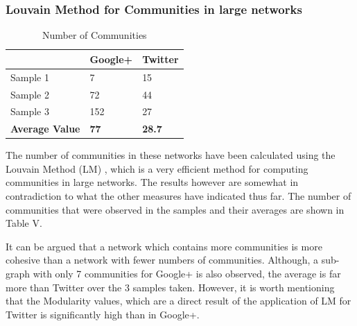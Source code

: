 \documentclass[a4paper, 10pt, conference]{ieeeconf}      %
\begin{document}
\subsubsection{Louvain Method for Communities in large networks \cite{c8}}

\begin{table}[htb]
\caption{Number of Communities}
\begin{center}
\begin{tabular}{ | l | l | l |} 
\hline
& \textbf{Google+} & \textbf{Twitter}\\[0.5ex]
\hline
Sample 1 & 7 & 15\\
Sample 2 & 72 & 44\\
Sample 3 & 152 & 27\\[0.5ex]
\hline
\textbf{Average Value} & \textbf{77} & \textbf{28.7}\\[0.5ex]
\hline
\end{tabular}
\end{center}
\end{table}

The number of communities in these networks have been calculated using the Louvain Method (LM) \cite{c8}, which is a very efficient method for computing communities in large networks. The results however are somewhat in contradiction to what the other measures have indicated thus far. The number of communities that were observed in the samples and their averages are shown in Table V.



It can be argued that a network which contains more communities is more cohesive than a network with fewer numbers of communities. Although, a sub-graph with only 7 communities for Google+ is also observed, the average is far more than Twitter over the 3 samples taken.
However, it is worth mentioning that the Modularity values, which are a direct result of the application of LM for Twitter is significantly high than in Google+.


\end{document}
